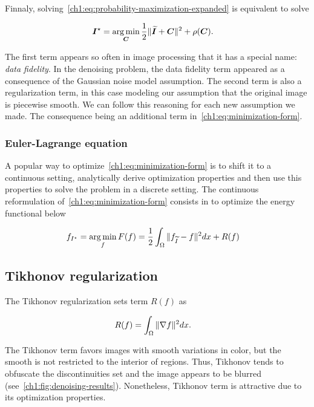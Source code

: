 Finnaly, solving~\cref{ch1:eq:probability-maximization-expanded} is equivalent to solve

\begin{align}
	\bm{I}^{\star} &= \operatorname*{arg\,min} _{\bm{C}} \frac{1}{2}\lVert\bm{\widetilde{I}} + \bm{C}\rVert^2 + \rho(\bm{C}).
	\label{ch1:eq:minimization-form}
\end{align}

The first term appears so often in image processing that it has a special name: \emph{data fidelity}. In the denoising problem, the data fidelity term appeared as a consequence of the Gaussian noise model assumption. The second term is also a regularization term, in this case modeling our assumption that the original image is piecewise smooth. We can follow this reasoning for each new assumption we made. The consequence being an additional term in~\cref{ch1:eq:minimization-form}.

\subsubsection{ Euler-Lagrange equation }

A popular way to optimize~\cref{ch1:eq:minimization-form} is to shift it to a continuous setting, analytically derive optimization properties and then use this properties to solve the problem in a discrete setting. The continuous reformulation of~\cref{ch1:eq:minimization-form} consists in to optimize the energy functional below

\begin{align}
	f_{I^{\star}} &= \operatorname*{arg\,min}_{f} F(f) = \frac{1}{2} \int_{\Omega}{ \lVert f_{\widetilde{I}} - f\rVert^2dx} + R(f)
	\label{ch1:eq:variational-formulation}
\end{align}

\subsection{Tikhonov regularization}

The Tikhonov regularization sets term $R(f)$ as

\begin{align*}
	R(f) &= \int_{\Omega}{ \lVert \nabla f \rVert^2 dx }.
\end{align*}

The Tikhonov term favors images with smooth variations in color, but the smooth is not restricted to the interior of regions. Thus, Tikhonov tends to obfuscate the discontinuities set and the image appears to be blurred (see~\cref{ch1:fig:denoising-results}). Nonetheless, Tikhonov term is attractive due to its optimization properties.

